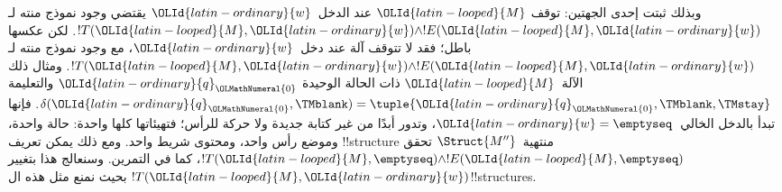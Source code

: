 \documentclass[../../../include/open-logic-section]{subfiles}
\begin{document}
\begin{explain}
  وبذلك ثبتت إحدى الجهتين: توقف $\OLId{latin-looped}{M}$ عند الدخل~$\OLId{latin-ordinary}{w}$ يقتضي
  وجود نموذج منته لـ$!T(\OLId{latin-looped}{M},\OLId{latin-ordinary}{w})\land !E(\OLId{latin-looped}{M},\OLId{latin-ordinary}{w})$. لكن عكسها
  باطل؛ فقد لا تتوقف آلة عند دخل~$\OLId{latin-ordinary}{w}$، مع وجود نموذج منته
  لـ$!T(\OLId{latin-looped}{M},\OLId{latin-ordinary}{w})\land !E(\OLId{latin-looped}{M},\OLId{latin-ordinary}{w})$. ومثال ذلك الآلة~$\OLId{latin-looped}{M}$ ذات
  الحالة الوحيدة $\OLId{latin-ordinary}{q}_\OLMathNumeral{0}$ والتعليمة
  $\delta(\OLId{latin-ordinary}{q}_\OLMathNumeral{0},\TMblank)=\tuple{\OLId{latin-ordinary}{q}_\OLMathNumeral{0},\TMblank,\TMstay}$.
  فإنها تبدأ بالدخل الخالي~$\OLId{latin-ordinary}{w}=\emptyseq$، وتدور أبدًا
  من غير كتابة جديدة ولا حركة للرأس؛ فتهيئاتها كلها واحدة:
  حالة واحدة، وموضع رأس واحد، ومحتوى شريط واحد. ومع ذلك يمكن
  تعريف !!{structure} منتهية~$\Struct{M''}$ تحقق
  $!T(\OLId{latin-looped}{M},\emptyseq)\land !E(\OLId{latin-looped}{M},\emptyseq)$، كما في التمرين.
  وسنعالج هذا بتغيير $!T(\OLId{latin-looped}{M},\OLId{latin-ordinary}{w})$ بحيث نمنع مثل هذه
  ال!!{structure}s.


\end{explain}
\end{document}
